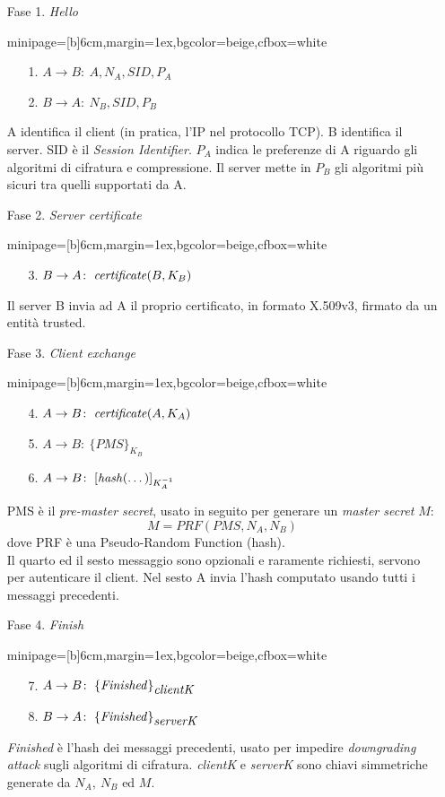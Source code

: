 \documentclass[a4paper, 11pt, twoside, openright, fleqn]{report}
\newcommand{\fromto}[2]{#1\rightarrow #2\!:\ }
\newenvironment{colbox}[2]%
{%
	\par\noindent\hspace{10pt}
	\begin{adjustbox}{minipage=[b]{#2},margin=1ex,bgcolor=#1,cfbox=white}
}{%
	\end{adjustbox}\newline%
}
\begin{document}
\clearpage
\begin{enumerate}
	\item[Fase 1.] \emph{Hello}
	\begin{colbox}{beige}{6cm}
		\begin{enumerate}
			\item[1.] $\fromto{A}{B}A,N_A,SID,P_A$
			\item[2.] $\fromto{B}{A}N_B,SID,P_B$
		\end{enumerate}
	\end{colbox}
	A identifica il client (in pratica, l'IP nel protocollo TCP).
	B identifica il server.
	SID è il \emph{Session Identifier}.
	$P_A$ indica le preferenze di A riguardo gli algoritmi di cifratura e compressione. Il server mette in $P_B$ gli algoritmi più sicuri tra quelli supportati da A.
	\item[Fase 2.] \emph{Server certificate}
	\begin{colbox}{beige}{6cm}
		\begin{enumerate}
			\item[3.] $\fromto{B}{A}\mbox{\emph{certificate}}(B,K_B)$
		\end{enumerate}
	\end{colbox}
	Il server B invia ad A il proprio certificato, in formato X.509v3, firmato da un entità trusted.
	\item[Fase 3.] \emph{Client exchange}
	\begin{colbox}{beige}{6cm}
		\begin{enumerate}
			\item[4.] $\fromto{A}{B}\mbox{\emph{certificate}}(A,K_A)$
			\item[5.] $\fromto{A}{B}\{PMS\}_{K_B}$
			\item[6.] $\fromto{A}{B}[\mbox{\emph{hash}}(\dots)]_{K_A^{-1}}$
		\end{enumerate}
	\end{colbox}
	PMS è il \emph{pre-master secret}, usato in seguito per generare un \emph{master secret} $M$:
	\begin{equation*}
		M = PRF(PMS, N_A, N_B)
	\end{equation*}
	dove PRF è una Pseudo-Random Function (hash).\\
	Il quarto ed il sesto messaggio sono opzionali e raramente richiesti, servono per autenticare il client. Nel sesto A invia l'hash computato usando tutti i messaggi precedenti.
	\item[Fase 4.] \emph{Finish}
	\begin{colbox}{beige}{6cm}
		\begin{enumerate}
			\item[7.] $\fromto{A}{B}\{\mbox{\emph{Finished}}\}_{\mbox{\emph{clientK}}}$
			\item[8.] $\fromto{B}{A}\{\mbox{\emph{Finished}}\}_{\mbox{\emph{serverK}}}$
		\end{enumerate}
	\end{colbox}
	\emph{Finished} è l'hash dei messaggi precedenti, usato per impedire \emph{downgrading attack} sugli algoritmi di cifratura.
	\emph{clientK} e \emph{serverK} sono chiavi simmetriche generate da $N_A,\ N_B$ ed $M$.
\end{enumerate}
\end{document}
